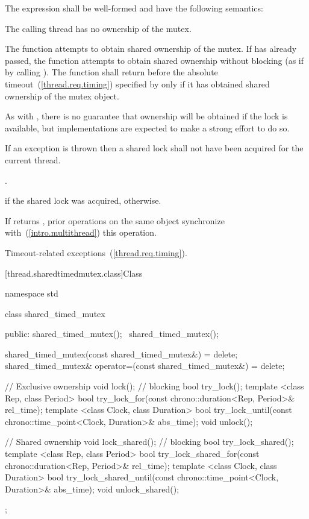 \pnum
The expression  shall be well-formed
and have the following semantics:

\begin{itemdescr}
\pnum
\requires The calling thread has no ownership of the mutex.

\pnum
\effects The function attempts to obtain shared ownership of the mutex. If
 has already passed, the function attempts to obtain shared
ownership without blocking (as if by calling ). The
function shall return before the absolute timeout~(\ref{thread.req.timing})
specified by  only if it has obtained shared ownership of the
mutex object. \begin{note} As with , there is no guarantee that
ownership will be obtained if the lock is available, but implementations are
expected to make a strong effort to do so. \end{note}
If an exception is thrown then a shared lock shall not have been acquired for
the current thread.

\pnum
\returntype {}.

\pnum
\returns {} if the shared lock was acquired,  otherwise.

\pnum
\sync If  returns , prior
 operations on the same object synchronize
with~(\ref{intro.multithread}) this operation.

\pnum
\throws Timeout-related exceptions~(\ref{thread.req.timing}).
\end{itemdescr}

[thread.sharedtimedmutex.class]{Class }

\begin{codeblock}
namespace std {
  class shared_timed_mutex {
  public:
    shared_timed_mutex();
    ~shared_timed_mutex();
  
    shared_timed_mutex(const shared_timed_mutex&) = delete;
    shared_timed_mutex& operator=(const shared_timed_mutex&) = delete;
  
    // Exclusive ownership
    void lock();  // blocking
    bool try_lock();
    template <class Rep, class Period>
      bool try_lock_for(const chrono::duration<Rep, Period>& rel_time);
    template <class Clock, class Duration>
      bool try_lock_until(const chrono::time_point<Clock, Duration>& abs_time);
    void unlock();
  
    // Shared ownership
    void lock_shared();  // blocking
    bool try_lock_shared();
    template <class Rep, class Period>
      bool
      try_lock_shared_for(const chrono::duration<Rep, Period>& rel_time);
    template <class Clock, class Duration>
      bool
      try_lock_shared_until(const chrono::time_point<Clock, Duration>& abs_time);
    void unlock_shared();
  };
}
\end{codeblock}

